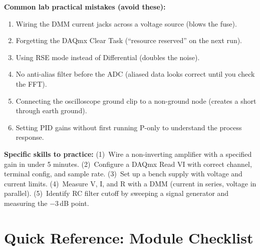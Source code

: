 \documentclass[11pt,letterpaper]{article}
\begin{document}
\begin{warnbox}
\textbf{Common lab practical mistakes (avoid these):}
\begin{enumerate}[nosep,leftmargin=*]
\item Wiring the DMM current jacks across a voltage source (blows the fuse).
\item Forgetting the DAQmx Clear Task (``resource reserved'' on the next run).
\item Using RSE mode instead of Differential (doubles the noise).
\item No anti-alias filter before the ADC (aliased data looks correct until you check the FFT).
\item Connecting the oscilloscope ground clip to a non-ground node (creates a short through earth ground).
\item Setting PID gains without first running P-only to understand the process response.
\end{enumerate}
\end{warnbox}

\begin{protip}
\textbf{Specific skills to practice:} (1)~Wire a non-inverting amplifier with a specified gain in under 5 minutes. (2)~Configure a DAQmx Read VI with correct channel, terminal config, and sample rate. (3)~Set up a bench supply with voltage and current limits. (4)~Measure V, I, and R with a DMM (current in series, voltage in parallel). (5)~Identify RC filter cutoff by sweeping a signal generator and measuring the $-3$\,dB point.
\end{protip}

\section{Quick Reference: Module Checklist}
\end{document}
